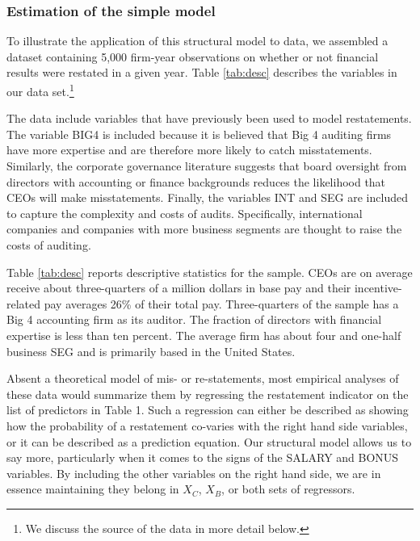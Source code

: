 \subsubsection{Estimation of the simple model}
To illustrate the application of this structural model to data, we assembled a dataset containing 5,000 firm-year observations on whether or not financial results were restated in a given year.
Table \ref{tab:desc} describes the variables in our data set.\footnote{
We discuss the source of the data in more detail below.}

The data include variables that have previously been used to model restatements.%
The variable BIG4 is included  because it is believed that Big 4 auditing firms have more expertise and are therefore more likely to catch misstatements. 
Similarly, the corporate governance literature suggests that board oversight from directors with accounting or finance backgrounds reduces the likelihood that CEOs will make misstatements. 
Finally, the variables INT and SEG are included to capture the complexity and costs of audits. 
Specifically, international companies and companies with more business segments are thought to raise the costs of auditing. 

Table \ref{tab:desc} reports descriptive statistics for the sample. CEOs are on average receive about three-quarters of a million dollars in base pay and their incentive-related pay averages 26\% of their total pay.
Three-quarters of the sample has a Big 4 accounting firm as its auditor. The fraction of directors with financial expertise is less than ten percent. 
The average firm has about four and one-half business SEG and is primarily based in the United States.

Absent a theoretical model of mis- or re-statements, most empirical
analyses of these data would summarize them by regressing the restatement
indicator on the list of predictors in Table 1. 
Such a regression can either be described
as showing how the probability of a restatement co-varies with the right hand side variables, or it can be described as a prediction equation.
Our structural model allows us to say more, particularly when it comes to the signs of the SALARY and BONUS variables.
By including the other variables on the right hand side, we are in essence maintaining they belong in $X_C$, $X_B$, or both sets of regressors.

